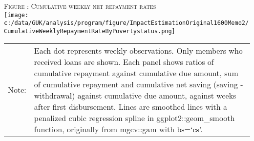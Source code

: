 \hfil\textsc{\footnotesize Figure \thefigure: Cumulative weekly net repayment rates\label{fig weeklysavingrepayrate}}\\
\hfil\texttt{[image: c:/data/GUK/analysis/program/figure/ImpactEstimationOriginal1600Memo2/CumulativeWeeklyRepaymentRateByPovertystatus.png]}\\
\renewcommand{\arraystretch}{1}
\hfil\begin{tabular}{>{\hfill\scriptsize}p{1cm}<{}>{\scriptsize}p{12cm}<{\hfill}}
Note:& Each dot represents weekly observations. Only members who received loans are shown. Each panel shows ratios of cumulative repayment against cumulative due amount, sum of cumulative repayment and cumulative net saving (saving - withdrawal) against cumulative due amount, against weeks after first disbursement. Lines are smoothed lines with a penalized cubic regression spline in \textsf{ggplot2::geom\_smooth} function, originally from \textsf{mgcv::gam} with \textsf{bs=`cs'}. \\[-1ex]
\end{tabular}





